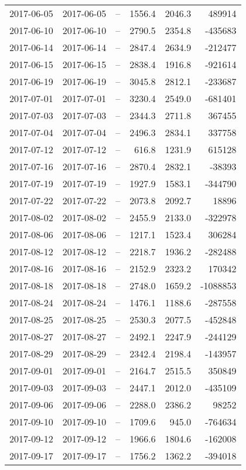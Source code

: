 \begin{table}[h]
\begin{tabular}{l l l r r r}
2017-06-05 & 2017-06-05 & -- & 1556.4 & 2046.3 & 489914\\
2017-06-10 & 2017-06-10 & -- & 2790.5 & 2354.8 & -435683\\
2017-06-14 & 2017-06-14 & -- & 2847.4 & 2634.9 & -212477\\
2017-06-15 & 2017-06-15 & -- & 2838.4 & 1916.8 & -921614\\
2017-06-19 & 2017-06-19 & -- & 3045.8 & 2812.1 & -233687\\
2017-07-01 & 2017-07-01 & -- & 3230.4 & 2549.0 & -681401\\
2017-07-03 & 2017-07-03 & -- & 2344.3 & 2711.8 & 367455\\
2017-07-04 & 2017-07-04 & -- & 2496.3 & 2834.1 & 337758\\
2017-07-12 & 2017-07-12 & -- & 616.8 & 1231.9 & 615128\\
2017-07-16 & 2017-07-16 & -- & 2870.4 & 2832.1 & -38393\\
2017-07-19 & 2017-07-19 & -- & 1927.9 & 1583.1 & -344790\\
2017-07-22 & 2017-07-22 & -- & 2073.8 & 2092.7 & 18896\\
2017-08-02 & 2017-08-02 & -- & 2455.9 & 2133.0 & -322978\\
2017-08-06 & 2017-08-06 & -- & 1217.1 & 1523.4 & 306284\\
2017-08-12 & 2017-08-12 & -- & 2218.7 & 1936.2 & -282488\\
2017-08-16 & 2017-08-16 & -- & 2152.9 & 2323.2 & 170342\\
2017-08-18 & 2017-08-18 & -- & 2748.0 & 1659.2 & -1088853\\
2017-08-24 & 2017-08-24 & -- & 1476.1 & 1188.6 & -287558\\
2017-08-25 & 2017-08-25 & -- & 2530.3 & 2077.5 & -452848\\
2017-08-27 & 2017-08-27 & -- & 2492.1 & 2247.9 & -244129\\
2017-08-29 & 2017-08-29 & -- & 2342.4 & 2198.4 & -143957\\
2017-09-01 & 2017-09-01 & -- & 2164.7 & 2515.5 & 350849\\
2017-09-03 & 2017-09-03 & -- & 2447.1 & 2012.0 & -435109\\
2017-09-06 & 2017-09-06 & -- & 2288.0 & 2386.2 & 98252\\
2017-09-10 & 2017-09-10 & -- & 1709.6 & 945.0 & -764634\\
2017-09-12 & 2017-09-12 & -- & 1966.6 & 1804.6 & -162008\\
2017-09-17 & 2017-09-17 & -- & 1756.2 & 1362.2 & -394018\\

\end{tabular}
\end{table}
